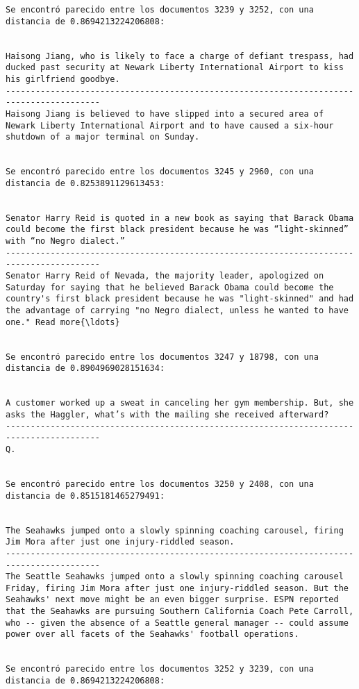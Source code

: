 \documentclass[11pt]{article}
\begin{document}
\begin{Verbatim}[commandchars=\\\{\}]
Se encontró parecido entre los documentos 3239 y 3252, con una distancia de 0.8694213224206808:


Haisong Jiang, who is likely to face a charge of defiant trespass, had ducked past security at Newark Liberty International Airport to kiss his girlfriend goodbye.
-----------------------------------------------------------------------------------------
Haisong Jiang is believed to have slipped into a secured area of Newark Liberty International Airport and to have caused a six-hour shutdown of a major terminal on Sunday.


Se encontró parecido entre los documentos 3245 y 2960, con una distancia de 0.8253891129613453:


Senator Harry Reid is quoted in a new book as saying that Barack Obama could become the first black president because he was “light-skinned” with “no Negro dialect.”
-----------------------------------------------------------------------------------------
Senator Harry Reid of Nevada, the majority leader, apologized on Saturday for saying that he believed Barack Obama could become the country's first black president because he was "light-skinned" and had the advantage of carrying "no Negro dialect, unless he wanted to have one." Read more{\ldots}


Se encontró parecido entre los documentos 3247 y 18798, con una distancia de 0.8904969028151634:


A customer worked up a sweat in canceling her gym membership. But, she asks the Haggler, what’s with the mailing she received afterward?
-----------------------------------------------------------------------------------------
Q.


Se encontró parecido entre los documentos 3250 y 2408, con una distancia de 0.8515181465279491:


The Seahawks jumped onto a slowly spinning coaching carousel, firing Jim Mora after just one injury-riddled season.
-----------------------------------------------------------------------------------------
The Seattle Seahawks jumped onto a slowly spinning coaching carousel Friday, firing Jim Mora after just one injury-riddled season. But the Seahawks' next move might be an even bigger surprise. ESPN reported that the Seahawks are pursuing Southern California Coach Pete Carroll, who -- given the absence of a Seattle general manager -- could assume power over all facets of the Seahawks' football operations.


Se encontró parecido entre los documentos 3252 y 3239, con una distancia de 0.8694213224206808:



\end{Verbatim}
\end{document}

